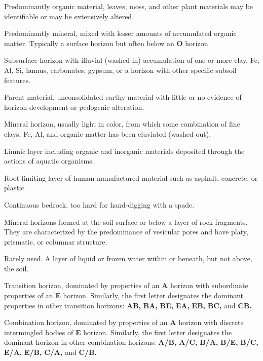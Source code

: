\documentclass[12pt]{exam}
\begin{document}
\begin{description}[labelsep=2.45em, align=right]
\item[O] 
Predominantly organic material, leaves, moss, and other plant materials may be identifiable or may be extensively altered.
\vspace{0.1in}
\item[A]
Predominantly mineral, mixed with lesser amounts of accumulated organic matter. Typically a surface horizon but often below an \textbf{O} horizon.
\vspace{0.1in}
\item[B]
Subsurface horizon with illuvial (washed in) accumulation of one or more clay, Fe, Al, Si, humus, carbonates, gypsum, or a horizon with other specific subsoil features.
\vspace{0.1in}
\item[C]
Parent material, unconsolidated earthy material with little or no evidence of horizon development or pedogenic alteration.
\vspace{0.1in}
\item[E]
Mineral horizon, usually light in color, from which some combination of fine clays, Fe, Al, and organic matter has been eluviated (washed out).
\vspace{0.1in}
\item[L] 
Limnic layer including organic and inorganic materials deposited through the actions of aquatic organisms.
\vspace{0.1in}
\item[M]
Root-limiting layer of human-manufactured material such as asphalt, concrete, or plastic.
\vspace{0.1in}
\item[R]
Continuous bedrock, too hard for hand-digging with a spade.
\vspace{0.1in}
\item[V]
Mineral horizons formed at the soil surface or below a layer of rock fragments. They are characterized by the predominance of vesicular pores and have platy, prismatic, or columnar structure.
\vspace{0.1in}
\item[W]
Rarely used. A layer of liquid or frozen water within or beneath, but not above, the soil.
\vspace{0.1in}
\item[AE]
Transition horizon, dominated by properties of an \textbf{A} horizon with subordinate properties of an \textbf{E} horizon. Similarly, the first letter designates the dominant properties in other transition horizons: \textbf{AB,} \textbf{BA,} \textbf{BE,} \textbf{EA,} \textbf{EB,} \textbf{BC,} and \textbf{CB.}
\vspace{0.1in}
\item[A/E] 
Combination horizon, dominated by properties of an \textbf{A} horizon with discrete intermingled bodies of \textbf{E} horizon. Similarly, the first letter designates the dominant horizon in other combination horizons: \textbf{A/B,} \textbf{A/C,} \textbf{B/A,} \textbf{B/E,} \textbf{B/C,} \textbf{E/A,} \textbf{E/B,} \textbf{C/A,} and \textbf{C/B.}
\end{description}
\end{document}
